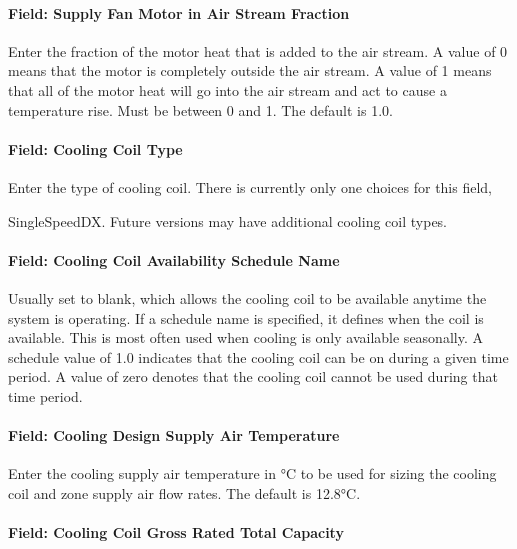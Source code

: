 \paragraph{Field: Supply Fan Motor in Air Stream Fraction}\label{field-supply-fan-motor-in-air-stream-fraction-2}

Enter the fraction of the motor heat that is added to the air stream. A value of 0 means that the motor is completely outside the air stream. A value of 1 means that all of the motor heat will go into the air stream and act to cause a temperature rise. Must be between 0 and 1. The default is 1.0.

\paragraph{Field: Cooling Coil Type}\label{field-cooling-coil-type-6}

Enter the type of cooling coil. There is currently only one choices for this field,

SingleSpeedDX. Future versions may have additional cooling coil types.

\paragraph{Field: Cooling Coil Availability Schedule Name}\label{field-cooling-coil-availability-schedule-name-5}

Usually set to blank, which allows the cooling coil to be available anytime the system is operating. If a schedule name is specified, it defines when the coil is available. This is most often used when cooling is only available seasonally. A schedule value of 1.0 indicates that the cooling coil can be on during a given time period. A value of zero denotes that the cooling coil cannot be used during that time period.

\paragraph{Field: Cooling Design Supply Air Temperature}\label{field-cooling-design-supply-air-temperature-1}

Enter the cooling supply air temperature in °C to be used for sizing the cooling coil and zone supply air flow rates. The default is 12.8°C.

\paragraph{Field: Cooling Coil Gross Rated Total Capacity}\label{field-cooling-coil-gross-rated-total-capacity-5}

